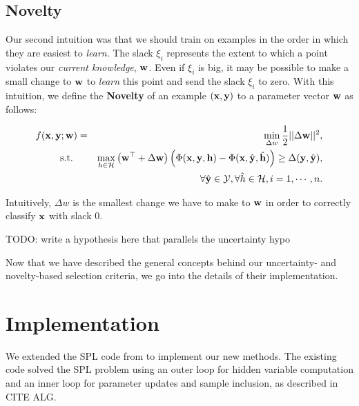 \documentclass{article}
\newcommand{\mysection}[1]{\vspace{-4mm}\section{#1}\vspace{-4mm}}
\begin{document}
\subsection{Novelty}
Our second intuition was that we should train on examples in the order in which they are easiest to \emph{learn}.  The slack $\xi_i$ represents the extent to which a point violates our \emph{current knowledge}, $\bf w$.  Even if $\xi_i$ is big, it may be possible to make a small change to $\bf w$ to \emph{learn} this point and send the slack $\xi_i$ to zero.  With this intuition, we define the \textbf{Novelty} of an example $(\bf x, \bf y)$ to a parameter vector $\bf w$ as follows:

\begin{eqnarray}
f(\bf x, \bf y; \bf w) &=&\min_{\Delta w} \frac{1}{2}||{\Delta\bf w}||^2, \nonumber \\
\mbox{s.t. } && \max_{h \in {\cal H}} \left( {\bf w}^\top + \Delta\bf w \right) \left(\Phi({\bf x},{\bf y},{\bf h}) - 
		\Phi({\bf x},\hat{\bf y},\hat{\bf h}) \right)
	 \geq \Delta({\bf y},\hat{\bf y}) , \nonumber \\
\label{eq:novelty}
&&\forall \hat{\bf y} \in {\cal Y}, \forall \hat{h} \in {\cal H}, i=1,\cdots,n.
\end{eqnarray}

Intuitively, $\Delta w$ is the smallest change we have to make to $\bf w$ in order to correctly classify $\bf x$ with slack 0.  

TODO: write a hypothesis here that parallels the uncertainty hypo


Now that we have described the general concepts behind our uncertainty- and novelty-based selection criteria, we go into the details of their implementation.

\mysection{Implementation}
\label{sec:implementation}




We extended the SPL code from \cite{SPL} to implement our new methods. The existing code solved the SPL problem using an outer loop for hidden variable computation and an inner loop for parameter updates and sample inclusion, as described in CITE ALG.
\end{document}
